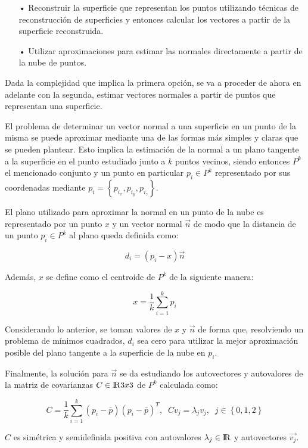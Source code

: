 \begin{itemize}
\item[•]Reconstruir la superficie que representan los puntos utilizando técnicas de reconstrucción de superficies y entonces calcular los vectores a partir de la superficie reconstruida.
\item[•]Utilizar aproximaciones para estimar las normales directamente a partir de la nube de puntos.
\end{itemize}

Dada la complejidad que implica la primera opción, se va a proceder de ahora en adelante con la segunda, estimar vectores normales a partir de puntos que representan una superficie.

El problema de determinar un vector normal a una superficie en un punto de la misma se puede aproximar mediante una de las formas más simples y claras que se pueden plantear. Esto implica la estimación de la normal a un plano tangente a la superficie en el punto estudiado junto a $k$ puntos vecinos\cite{normales_extra}, siendo entonces $P^k$ el mencionado conjunto y un punto en particular $p_{i} \in P^{k}$ representado por sus coordenadas mediante $p_{i}=\left\lbrace p_{i_x},p_{i_y},p_{i_z} \right\rbrace$.

El plano utilizado para aproximar la normal en un punto de la nube es representado por un punto $x$ y un vector normal $\vec{n}$ de modo que la distancia de un punto $p_{i} \in P^{k}$ al plano queda definida como:

$$d_i=(p_{i}-x)\vec{n}$$

Además, $x$ se define como el centroide de $P^{k}$ de la siguiente manera:

$$x=\frac{1}{k}\sum_{i=1}^{k} p_i$$

Considerando lo anterior, se toman valores de $x$ y $\vec{n}$ de forma que, resolviendo un problema de mínimos cuadrados, $d_i$ sea cero para utilizar la mejor aproximación posible del plano tangente a la superficie de la nube en $p_i$.

Finalmente, la solución para $\vec{n}$ se da estudiando los autovectores y autovalores de la matriz de covarianzas $C \in {\rm I\!R} 3x3$ de $P^{k}$ calculada como:

$$C=\frac{1}{k}\sum_{i=1}^{k} (p_i-\bar{p})(p_i-\bar{p})^T,\;\;Cv_{j}=\lambda_{j}v_{j},\;\;j \in \left\lbrace 0,1,2 \right\rbrace$$

$C$ es simétrica y semidefinida positiva con autovalores $\lambda_j \in {\rm I\!R} $ y autovectores $\vec{v_j}$.

